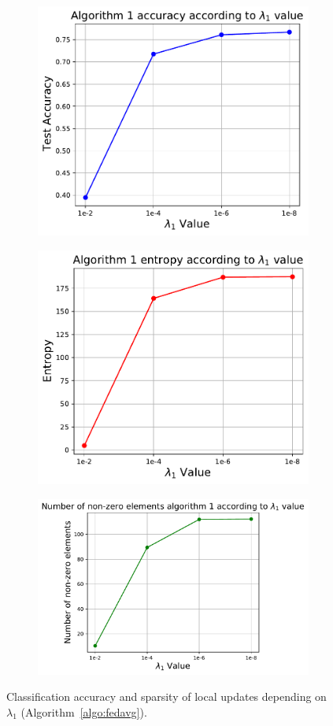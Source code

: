 \documentclass{article} %
\begin{document}
\begin{figure}[ht!]
\begin{subfigure}{.5\textwidth}
  \centering
  \includegraphics[width=.8\linewidth]{textfigure/algo1acc.pdf}
  \label{fig:sub31}
\end{subfigure}
\begin{subfigure}{.5\textwidth}
  \centering
  \includegraphics[width=.8\linewidth]{textfigure/algo1entropy.pdf}
  \label{fig:sub32}
\end{subfigure}
\begin{subfigure}{1\textwidth}
  \centering
  \includegraphics[width=.6\linewidth]{textfigure/algo1nonzero.pdf}
  \label{fig:sub33}
\end{subfigure}
\caption{Classification accuracy and sparsity of local updates depending on $\lambda_{1}$ (Algorithm~\ref{algo:fedavg}).}
\label{fig:algo1 lambda1}
\end{figure}
\end{document}
